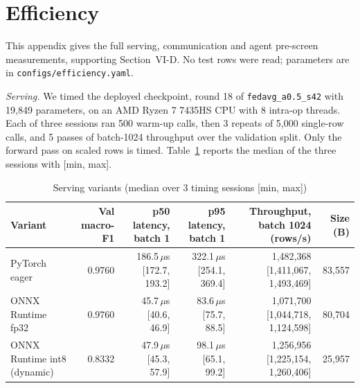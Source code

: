 \section{Efficiency}
\label{app:eff}
This appendix gives the full serving, communication and agent pre-screen measurements,
supporting Section~VI-D. No test rows were read; parameters are in
\texttt{configs/efficiency.yaml}.

\emph{Serving.} We timed the deployed checkpoint, round 18 of \texttt{fedavg\_a0.5\_s42} %
with 19,849 parameters, on an AMD Ryzen 7 7435HS CPU with 8 intra-op threads. Each of three %
sessions ran 500 warm-up calls, then 3 repeats of 5,000 single-row calls, and 5 passes of %
batch-1024 throughput over the validation split. Only the forward pass on scaled rows is %
timed. Table~\ref{tab:serving} reports the median of the three sessions with [min, max].

\begin{table}[t]
\centering
\caption{Serving variants (median over 3 timing sessions [min, max])} %
\label{tab:serving}
\footnotesize
\begin{tabular}{@{}lrrrrr@{}}
\toprule
Variant & Val macro-F1 & p50 latency, batch 1 & p95 latency, batch 1 & Throughput, batch 1024 (rows/s) & Size (B)\\ %
\midrule
PyTorch eager & 0.9760 & 186.5\,$\mu$s [172.7, 193.2] & 322.1\,$\mu$s [254.1, 369.4] & 1,482,368 [1,411,067, 1,493,469] & 83,557\\ %
ONNX Runtime fp32 & 0.9760 & 45.7\,$\mu$s [40.6, 46.9] & 83.6\,$\mu$s [75.7, 88.5] & 1,071,700 [1,044,718, 1,124,598] & 80,704\\ %
ONNX Runtime int8 (dynamic) & 0.8332 & 47.9\,$\mu$s [45.3, 57.9] & 98.1\,$\mu$s [65.1, 99.2] & 1,256,956 [1,225,154, 1,260,406] & 25,957\\ %
\bottomrule
\end{tabular}
\end{table}

